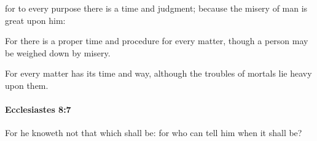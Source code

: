 			\begin{versebox}
					\item[BHS] 
					\item[LXX] 
					\item[ASV] for to every purpose there is a time and judgment; because the misery of man is great upon him:
					\item[NIV] For there is a proper time and procedure for every matter, though a person may be weighed down by misery.
					\item[NRSV] For every matter has its time and way, although the troubles of mortals lie heavy upon them.
			\end{versebox}

		\paragraph{Ecclesiastes 8:7} %
			\label{ECCLESIASTES-8-7}

			For he knoweth not that which shall be: for who can tell him when it shall be?

